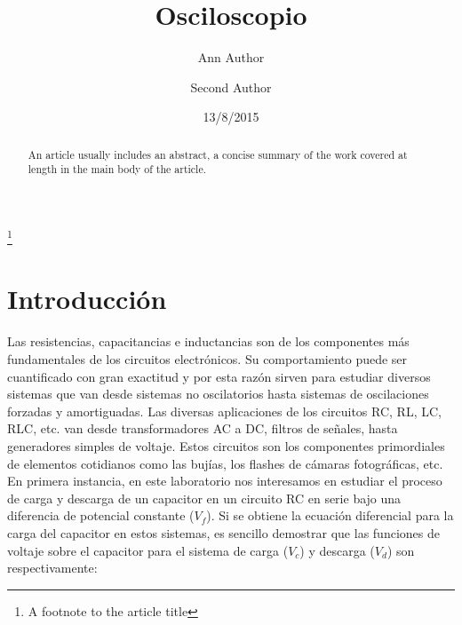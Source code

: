 \documentclass[%
 reprint,
 amsmath,amssymb,
 aps,
]{revtex4-1}
\begin{document}

\title{Osciloscopio}%
\thanks{A footnote to the article title}%

\author{Ann Author}
\author{Second Author}%
%

\date{13/8/2015}%

\begin{abstract}
An article usually includes an abstract, a concise summary of the work
covered at length in the main body of the article. 
\end{abstract}


\maketitle


\section{\label{sec:level1}Introducci\'on}

Las resistencias, capacitancias e inductancias son de los componentes m\'as fundamentales de los circuitos electr\'onicos. Su comportamiento puede ser cuantificado con gran exactitud y por esta raz\'on sirven para estudiar diversos sistemas que van desde sistemas no oscilatorios hasta sistemas de oscilaciones forzadas y amortiguadas. Las diversas aplicaciones de los circuitos RC, RL, LC, RLC, etc. van desde transformadores AC a DC, filtros de señales, hasta generadores simples de voltaje. Estos circuitos son los componentes primordiales de elementos cotidianos como las buj\'ias, los flashes de c\'amaras fotogr\'aficas, etc.\\

En primera instancia, en este laboratorio nos interesamos en estudiar el proceso de carga y descarga de un capacitor en un circuito RC en serie bajo una diferencia de potencial constante ($V_f$). Si se obtiene la ecuación diferencial para la carga del capacitor en estos sistemas, es sencillo demostrar que las funciones de voltaje sobre el capacitor para el sistema de carga ($V_c$) y descarga ($V_d$) son respectivamente:\\
\end{document}
